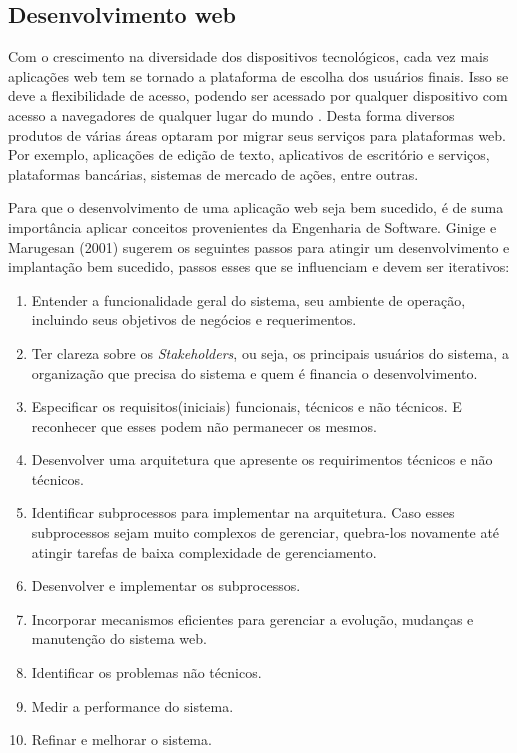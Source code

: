 \subsection{Desenvolvimento web}

Com o crescimento na diversidade dos dispositivos tecnológicos, cada vez mais aplicações web tem se tornado a plataforma de escolha dos usuários finais. Isso se deve a flexibilidade de acesso, podendo ser acessado por qualquer dispositivo com acesso a navegadores de qualquer lugar do mundo \cite{ref6}. Desta forma diversos produtos de várias áreas optaram por migrar seus serviços para plataformas web. Por exemplo, aplicações de edição de texto, aplicativos de escritório e serviços, plataformas bancárias, sistemas de mercado de ações, entre outras.

Para que o desenvolvimento de uma aplicação web seja bem sucedido, é de suma importância aplicar conceitos provenientes da Engenharia de Software. Ginige e Marugesan (2001) \cite{ref7} sugerem os seguintes passos para atingir um desenvolvimento e implantação bem sucedido, passos esses que se influenciam e devem ser iterativos:

\begin{enumerate}
    \item Entender a funcionalidade geral do sistema, seu ambiente de operação, incluindo seus objetivos de negócios e requerimentos.
    \item Ter clareza sobre os \textit{Stakeholders}, ou seja, os principais usuários do sistema, a organização que precisa do sistema e quem é financia o desenvolvimento.
    \item Especificar os requisitos(iniciais) funcionais, técnicos e não técnicos. E reconhecer que esses podem não permanecer os mesmos.
    \item Desenvolver uma arquitetura que apresente os requirimentos técnicos e não técnicos.
    \item Identificar subprocessos para implementar na arquitetura. Caso esses subprocessos sejam muito complexos de gerenciar, quebra-los novamente até atingir tarefas de baixa complexidade de gerenciamento.
    \item Desenvolver e implementar os subprocessos.
    \item Incorporar mecanismos eficientes para gerenciar a evolução, mudanças e manutenção do sistema web.
    \item Identificar os problemas não técnicos.
    \item Medir a performance do sistema.
    \item Refinar e melhorar o sistema. 
    
\end{enumerate}

